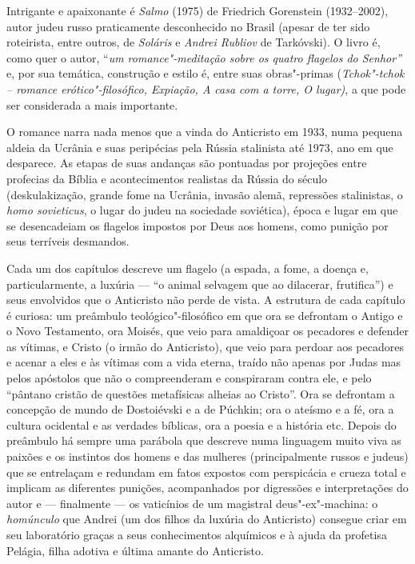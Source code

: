 Intrigante e apaixonante é \emph{Salmo} (1975) de Friedrich Gorenstein (1932--2002), autor judeu russo praticamente desconhecido no
Brasil (apesar de ter sido roteirista, entre outros, de \emph{Soláris}
e \emph{Andrei Rubliov} de Tarkóvski). O livro é, como quer o autor,
``\emph{um romance"-meditação sobre os quatro flagelos do Senhor''} e,
por sua temática, construção e estilo é, entre suas obras"-primas
(\emph{Tchok"-tchok -- romance erótico"-filosófico, Expiação, A casa com a
torre, O lugar)}, a que pode ser considerada a mais importante.

O romance narra nada menos que a vinda do Anticristo em 1933, numa
pequena aldeia da Ucrânia e suas peripécias pela Rússia stalinista até
1973, ano em que desparece. As etapas de suas andanças são pontuadas por
projeções entre profecias da Bíblia e acontecimentos realistas da Rússia
do século  (deskulakização, grande fome na Ucrânia, invasão alemã,
repressões stalinistas, o \emph{homo sovieticus}, o lugar do judeu na
sociedade soviética), época e lugar em que se desencadeiam os flagelos
impostos por Deus aos homens, como punição por seus terríveis desmandos.

Cada um dos capítulos descreve um flagelo (a espada, a fome, a doença e,
particularmente, a luxúria --- ``o animal selvagem que ao dilacerar,
frutifica'') e seus envolvidos que o Anticristo não perde de vista. A
estrutura de cada capítulo é curiosa: um preâmbulo teológico"-filosófico
em que ora se defrontam o Antigo e o Novo Testamento, ora Moisés, que
veio para amaldiçoar os pecadores e defender as vítimas, e Cristo (o
irmão do Anticristo), que veio para perdoar aos pecadores e acenar a
eles e às vítimas com a vida eterna, traído não apenas por Judas mas
pelos apóstolos que não o compreenderam e conspiraram contra ele, e pelo
``pântano cristão de questões metafísicas alheias ao Cristo''. Ora se
defrontam a concepção de mundo de Dostoiévski e a de Púchkin; ora o ateísmo e a fé,
ora a cultura ocidental e as verdades bíblicas, ora a poesia e a
história etc. Depois do preâmbulo há sempre uma parábola que descreve
numa linguagem muito viva as paixões e os instintos dos homens e das
mulheres (principalmente russos e judeus) que se entrelaçam e redundam
em fatos expostos com perspicácia e crueza total e implicam as
diferentes punições, acompanhados por digressões e interpretações do
autor e --- finalmente --- os vaticínios de um magistral deus"-ex"-machina:
o \emph{homúnculo} que Andrei (um dos filhos da luxúria do Anticristo)
consegue criar em seu laboratório graças a seus conhecimentos alquímicos
e à ajuda da profetisa Pelágia, filha adotiva e última amante do
Anticristo.

